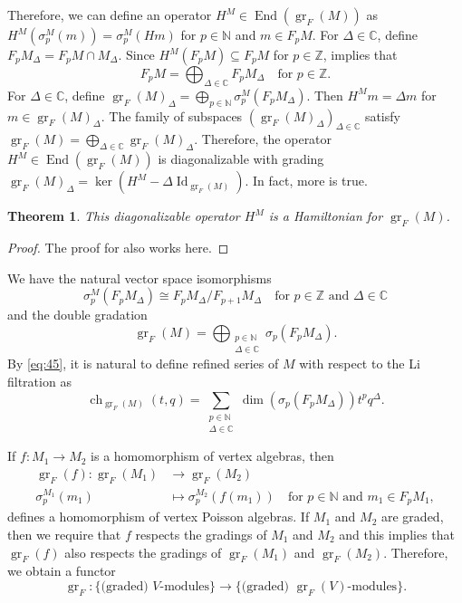 \documentclass[a4paper, 12pt, reqno]{amsart}
\newtheorem{theorem}{Theorem}[subsection]
\theoremstyle{remark}
\numberwithin{equation}{subsection}
\DeclareMathOperator{\Id}{Id}
\DeclareMathOperator{\gr}{gr}
\DeclareMathOperator{\End}{End}
\DeclareMathOperator{\ch}{ch}
\begin{document}
Therefore, we can define an operator $H^M \in \End(\gr_F(M))$ as $H^M(\sigma^M_p(m)) = \sigma^M_p(Hm)$ for $p \in \mathbb{N}$ and $m \in F_pM$.
For $\Delta \in \mathbb{C}$, define $F_pM_{\Delta} = F_pM \cap M_{\Delta}$.
Since $H^M(F_pM) \subseteq F_pM$ for $p \in \mathbb{Z}$,  implies that
\begin{equation}
  \label{eq:44}
  F_pM = \bigoplus_{\Delta \in \mathbb{C}}F_pM_{\Delta} \quad \text{for }p \in \mathbb{Z}.
\end{equation}
For $\Delta\in \mathbb{C}$, define $\gr_F(M)_{\Delta} = \bigoplus_{p \in \mathbb{N}}\sigma^M_p(F_pM_{\Delta})$.
Then $H^Mm = \Delta m$ for $m \in \gr_F(M)_{\Delta}$.
The family of subspaces $(\gr_F(M)_{\Delta})_{\Delta \in \mathbb{C}}$ satisfy $\gr_F(M) = \bigoplus_{\Delta \in \mathbb{C}} \gr_F(M)_{\Delta}$.
Therefore, the operator $H^M \in \End(\gr_F(M))$ is diagonalizable with grading $\gr_F(M)_{\Delta} = \ker(H^M - \Delta\Id_{\gr_F(M)})$.
In fact, more is true.
\begin{theorem}
  \label{thr:35}
  This diagonalizable operator $H^M$ is a Hamiltonian for $\gr_F(M)$.
\end{theorem}

\begin{proof}
  The proof for  also works here.
\end{proof}

We have the natural vector space isomorphisms
\begin{equation*}
  \sigma^M_p(F_pM_{\Delta}) \cong F_pM_{\Delta}/F_{p + 1}M_{\Delta} \quad \text{for }p \in \mathbb{Z}\text{ and }\Delta \in \mathbb{C}
\end{equation*}
and the double gradation
\begin{equation}
  \label{eq:45}
  \gr_F(M) =\bigoplus_{\substack{p \in \mathbb{N} \\ \Delta \in \mathbb{C}}}\sigma_p(F_pM_{\Delta}).
\end{equation}
By \eqref{eq:45}, it is natural to define refined series of $M$ with respect to the Li filtration as
\begin{equation*}
  \ch_{\gr_F(M)}(t, q) = \sum_{\substack{p \in \mathbb{N} \\ \Delta \in \mathbb{C}}}\dim(\sigma_p(F_pM_{\Delta}))t^pq^{\Delta}.
\end{equation*}

If $f: M_1 \to M_2$ is a homomorphism of vertex algebras, then
\begin{align*}
  \gr_F(f): \gr_F(M_1) &\to \gr_F(M_2) \\
  \sigma^{M_1}_p(m_1) &\mapsto \sigma^{M_2}_p(f(m_1)) \quad \text{for }p \in \mathbb{N}\text{ and } m_1 \in F_pM_1,
\end{align*}
defines a homomorphism of vertex Poisson algebras.
If $M_1$ and $M_2$ are graded, then we require that $f$ respects the gradings of $M_1$ and $M_2$ and this implies that $\gr_F(f)$ also respects the gradings of $\gr_F(M_1)$ and $\gr_F(M_2)$.
Therefore, we obtain a functor
\begin{equation*}
  \gr_F: \{\text{(graded) $V$-modules}\} \to \{\text{(graded) $\gr_F(V)$-modules}\}.
\end{equation*}
\end{document}

